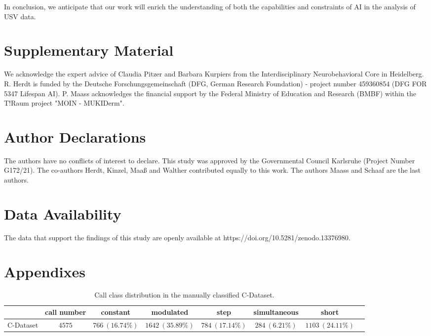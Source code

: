 \documentclass[preprint,NumberedRefs]{JASA}
\begin{document}
In conclusion, we anticipate that our work will enrich the understanding of both the capabilities and constraints of AI in the analysis of USV data.


\FloatBarrier

\section{Supplementary Material}
\label{sec:Supplementary_material}

\begin{acknowledgments}
\label{sec:Acknowledgements}

We acknowledge the expert advice of Claudia Pitzer and Barbara Kurpiers from the Interdisciplinary Neurobehavioral Core in Heidelberg. R. Herdt is funded by the Deutsche Forschungsgemeinschaft (DFG, German Research Foundation) - project number 459360854 (DFG FOR 5347 Lifespan AI). P. Maass acknowledges the financial support by the Federal Ministry of Education and Research (BMBF) within the T!Raum project "MOIN - MUKIDerm".


\end{acknowledgments}

\section{Author Declarations}
\label{sec:Author_declarations}
The authors have no conflicts of interest to declare.
This study was approved by the Governmental Council Karlsruhe (Project Number G172/21).
The co-authors Herdt, Kinzel, Maaß and Walther contributed equally to this work. The authors Maass and Schaaf are the last authors.


\section{Data Availability}
\label{sec:Data_Avaliability}

The data that support the findings of this study are openly available at https://doi.org/10.5281/zenodo.13376980.

\section{Appendixes}
\label{sec:Appendixes}

\begin{table}[ht]
    \caption{Call class distribution in the manually classified C-Dataset.}\label{tab:datasets_overview}
    \begin{ruledtabular}
    \scriptsize
    \begin{tabular}{lccccccc}
       & call number & constant & modulated & step & simultaneous  & short\\
  
      \hline
      C-Dataset & \(4575\) & \(766 \ (16.74\%)\) & \(1642 \ (35.89\%)\) & \(784 \ (17.14\%)\) & \(284 \ (6.21\%)\) & \(1103 \ (24.11\%)\)\\
  
    \end{tabular}
    \end{ruledtabular}
  \end{table}
\end{document}
